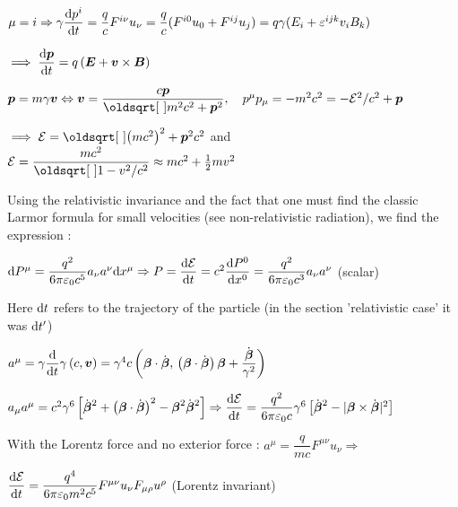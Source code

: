 \begin{squishlist}
\item $\mu = i \Rightarrow \gamma\dfrac{\textrm{d} p^i}{\textrm{d} t} = \dfrac{q}{c} F^{i\nu}u_{\nu} = \dfrac{q}{c} (F^{i0}u_{0} +F^{ij}u_{j})= q\gamma(E_i + \varepsilon^{ijk}v_iB_k)$

$ \implies \dfrac{\ud \Vec{p} }{\ud t}  = q\left(\vec{E} + \vec{v} \times \vec{B} \right)$


\item $\vec{p} = m\gamma\vec{v} \Leftrightarrow \vec{v} = \dfrac{c\vec{p}}{\sqrt{m^2c^2 + \vec{p}^2}}, \quad p^{\mu}p_{\mu} = -m^2c^2 = -\E^2/c^2 +\Vec{p}$

$ \implies \E = \sqrt{\left(mc^2\right)^2 + \vec{p}^2c^2}$ \quad and \quad $\E = \dfrac{mc^2}{\sqrt{1-v^2/c^2}} \approx mc^2 + \half mv^2$  

\end{squishlist}
\begin{squishlist}
\item[] Using the relativistic invariance and the fact that one must find the classic Larmor formula for small velocities (see non-relativistic radiation), we find the expression :

\item $\textrm{d} P^{\mu } =  \dfrac{q^2}{6\pi \varepsilon_0 c^5}a_{\nu}a^{\nu} \textrm{d} x^{\mu} \Rightarrow P = \dfrac{\textrm{d} \mathcal{E}}{\textrm{d} t} = c^2 \dfrac{\textrm{d} P^0}{\textrm{d} x^0} = \dfrac{q^2}{6\pi\varepsilon_0c^3} a_{\nu}a^{\nu}$ (scalar)

\item Here $\textrm{d} t$ refers to the trajectory of the particle (in the section 'relativistic case' it was $\textrm{d} t'$)

\item $a^{\mu} = \gamma \dfrac{\textrm{d}}{\textrm{d} t} \gamma \left(c, \mbox{\boldmath$v$}\right) = \gamma^4 c \left(\mbox{\boldmath$\beta$}\cdot\dot{\mbox{\boldmath$\beta$}}, \, \left(\mbox{\boldmath$\beta$}\cdot\dot{\mbox{\boldmath$\beta$}}\right)\mbox{\boldmath$\beta$} + \dfrac{\dot{\mbox{\boldmath$\beta$}}}{\gamma^2}\right)$

\item $a_{\mu}a^{\mu} = c^2\gamma^6 \left[ \dot{\mbox{\boldmath$\beta$}}^2 + \left(\mbox{\boldmath$\beta$}\cdot\dot{\mbox{\boldmath$\beta$}}\right)^2 -\mbox{\boldmath$\beta$}^2 \dot{\mbox{\boldmath$\beta$}}^2   \right] \Rightarrow \dfrac{\textrm{d} \mathcal{E}}{\textrm{d} t} = \dfrac{q^2}{6\pi\varepsilon_0c}\gamma^6 \left[\dot{\mbox{\boldmath$\beta$}}^2 - |\mbox{\boldmath$\beta$} \times \dot{\mbox{\boldmath$\beta$}}|^2\right]$

\item[] With the Lorentz force and no exterior force : $a^{\mu} = \dfrac{q}{mc} F^{\mu\nu}u_{\nu} \Rightarrow $

\item $\dfrac{\textrm{d} \mathcal{E}}{\textrm{d} t} =  \dfrac{q^4}{6\pi\varepsilon_0m^2c^5}F^{\mu\nu}u_{\nu}F_{\mu\rho}u^{\rho}$ \quad (Lorentz invariant)
\end{squishlist}

